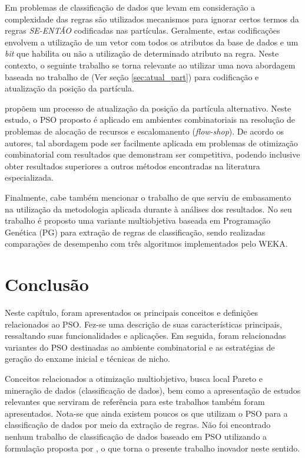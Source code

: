 \documentclass[
	12pt,				%
	openany,			%
	oneside,	
	a4paper,			%
	brazil,				%
	]{unimontes-ppgmsc-abntex2}
\begin{document}
Em problemas de classificação de dados que levam em consideração a complexidade das regras são utilizados mecanismos para ignorar certos termos da regras {\em SE-ENTÃO} codificadas nas partículas. Geralmente, estas codificações envolvem a utilização de um vetor com todos os atributos da base de dados e um {\em bit} que habilita ou não a utilização de determinado atributo na regra. Neste contexto, o seguinte trabalho se torna relevante ao utilizar uma nova abordagem baseada no trabalho de  (Ver seção \ref{sec:atual_part}) para codificação e atualização da posição da partícula.

 propõem um processo de atualização da posição da partícula alternativo. Neste estudo, o PSO proposto é aplicado em ambientes combinatoriais na resolução de problemas de alocação de recursos e escalomanento ({\em flow-shop}). De acordo os autores, tal abordagem pode ser facilmente aplicada em problemas de otimização combinatorial com resultados que demonstram ser competitiva, podendo inclusive obter resultados superiores a outros métodos encontradas na literatura especializada.

Finalmente, cabe também mencionar o trabalho de  que serviu de embasamento na utilização da metodologia aplicada durante à análises dos resultados. No seu trabalho é proposto uma variante multiobjetiva baseada em Programação Genética (PG) para extração de regras de classificação, sendo realizadas comparações de desempenho com três algoritmos implementados pelo WEKA.

\section{Conclusão}

Neste capítulo, foram apresentados os principais conceitos e definições relacionados ao PSO. Fez-se uma descrição de suas características principais, ressaltando suas funcionalidades e aplicações. Em seguida, foram relacionadas variantes do PSO destinadas ao ambiente combinatorial e as estratégias de geração do enxame inicial e técnicas de nicho.

Conceitos relacionados a otimização multiobjetivo, busca local Pareto e mineração de dados (classificação de dados), bem como a apresentação de estudos relevantes que serviram de referência para este trabalhos também foram apresentados. Nota-se que ainda existem poucos os que utilizam o PSO para a classificação de dados por meio da extração de regras. Não foi encontrado nenhum trabalho de classificação de dados baseado em PSO utilizando a formulação proposta por , o que torna o presente trabalho inovador neste sentido.
\end{document}
